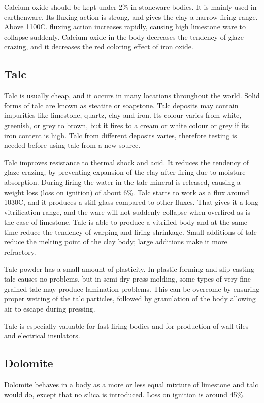 Calcium oxide should be kept under 2\% in stoneware bodies. It is mainly used 
in earthenware. Its fluxing action is strong, and gives the clay a narrow 
firing range. Above 1100\degree C. fluxing action increases rapidly, causing 
high limestone ware to collapse suddenly. Calcium oxide in the body decreases 
the tendency of glaze crazing, and it decreases the red coloring effect of iron 
oxide.
\subsection{Talc}
Talc is usually cheap, and it occurs in many locations throughout the world. 
Solid forms of talc are known as steatite or soapstone. Talc deposits may 
contain impurities like limestone, quartz, clay and iron. Its colour varies 
from white, greenish, or grey to brown, but it fires to a cream or white colour 
or grey if its iron content is high. Talc from different deposits varies, 
therefore testing is needed before using talc from a new source.

Talc improves resistance to thermal shock and acid. It reduces the tendency of 
glaze crazing, by preventing expansion of the clay after firing due to moisture 
absorption. During firing the water in the talc mineral is released, causing a 
weight loss (loss on ignition) of about 6\%. Talc starts to work as a flux 
around 1030\degree C, and it produces a stiff glass compared to other fluxes. 
That gives it a long vitrification range, and the ware will not suddenly 
collapse when overfired as is the case of limestone. Talc is able to produce a 
vitrified body and at the same time reduce the tendency of warping and firing 
shrinkage. Small additions of talc reduce the melting point of the clay body; 
large additions make it more refractory.

Talc powder has a small amount of plasticity. In plastic forming and slip 
casting talc causes no problems, but in semi-dry press molding, some types of 
very fine grained talc may produce lamination problems. This can be overcome by 
ensuring proper wetting of the talc particles, followed by granulation of the 
body allowing air to escape during pressing.

Talc is especially valuable for fast firing bodies and for production of wall 
tiles and electrical insulators.
\subsection{Dolomite}
Dolomite behaves in a body as a more or less equal mixture of limestone and 
talc would do, except that no silica is introduced. Loss on ignition is around 
45\%.
